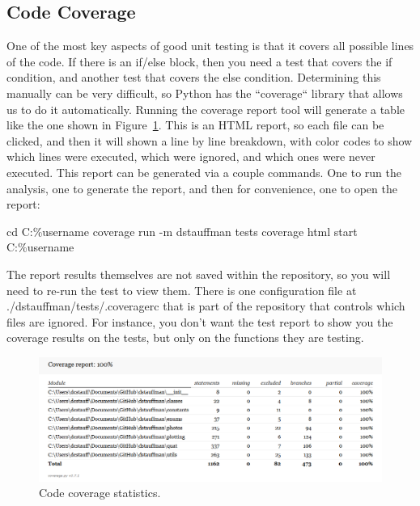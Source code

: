 \documentclass[12pt]{article}
\begin{document}
\subsection{Code Coverage}\label{h2:Code_coverage}
One of the most key aspects of good unit testing is that it covers all possible lines of the code.  If there is an if/else block, then you need a test that covers the if condition, and another test that covers the else condition.  Determining this manually can be very difficult, so Python has the ``coverage`` library that allows us to do it automatically.  Running the coverage report tool will generate a table like the one shown in Figure~\ref{fig:code_coverage}.  This is an HTML report, so each file can be clicked, and then it will shown a line by line breakdown, with color codes to show which lines were executed, which were ignored, and which ones were never executed.  This report can be generated via a couple commands.  One to run the analysis, one to generate the report, and then for convenience, one to open the report:
\begin{PlainText}
cd C:\Users\%username%
coverage run -m dstauffman tests
coverage html
start C:\Users\%username%
\end{PlainText}

The report results themselves are not saved within the repository, so you will need to re-run the test to view them.  There is one configuration file at ./dstauffman/tests/.coveragerc that is part of the repository that controls which files are ignored.  For instance, you don't want the test report to show you the coverage results on the tests, but only on the functions they are testing.

\begin{figure}[H]
    \centering
    \includegraphics[width=\textwidth]{Coverage.png}
    \caption{Code coverage statistics.}
    \label{fig:code_coverage}
\end{figure}
\end{document}
